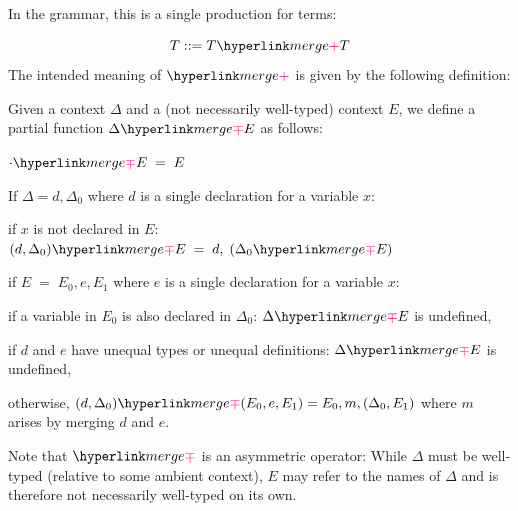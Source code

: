 \hypertarget{merge}{In the grammar, this is a single production for terms:}
\[T ::= \recmerge TT\]
The intended meaning of $\recmergesym$ is given by the following definition:
\begin{definition}\label{def:recmerge}\rm
Given a context $\Delta$ and a (not necessarily well-typed) context $E$, we define a partial function $\contmerge\Delta E$ as follows:
    \begin{compactitem}
    \item $\contmerge\cdot E \;=\; E$
    \item If $\Delta=d,\Delta_0$ where $d$ is a single declaration for a variable $x$:
     \begin{compactitem}
      \item if $x$ is not declared in $E$:
        $\contmerge{(d,\Delta_0)}E \;=\; d,\;(\contmerge{\Delta_0} E)$
      \item if $E\;=\;E_0,e,E_1$ where $e$ is a single declaration for a variable $x$:
       \begin{compactitem}
        \item if a variable in $E_0$ is also declared in $\Delta_0$: $\contmerge\Delta E$ is undefined,
        \item if $d$ and $e$ have unequal types or unequal definitions: $\contmerge\Delta E$ is undefined\footnotemark,
        \item otherwise, $\contmerge{(d,\Delta_0)}{(E_0,e,E_1)}=E_0,m,(\Delta_0,E_1)$ where $m$ arises by merging $d$ and $e$.
       \end{compactitem}
     \end{compactitem}
    \end{compactitem}
\end{definition}
Note that $\contmergesym$ is an asymmetric operator: While $\Delta$ must be well-typed (relative to some ambient context), $E$ may refer to the names of $\Delta$ and is therefore not necessarily well-typed on its own.


